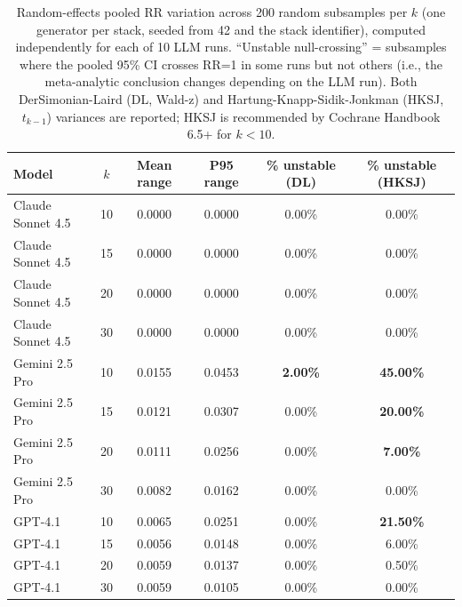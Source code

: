 \documentclass[11pt]{article}
\newenvironment{fittab}{\begin{lrbox}{\fittabbox}}{\end{lrbox}%
  \ifdim\wd\fittabbox>\linewidth\resizebox{\linewidth}{!}{\usebox{\fittabbox}}\else\usebox{\fittabbox}\fi}
\begin{document}
\begin{table}[htbp]
\centering
\caption{Random-effects pooled RR variation across 200 random subsamples per $k$ (one generator per stack, seeded from 42 and the stack identifier), computed independently for each of 10 LLM runs. ``Unstable null-crossing'' = subsamples where the pooled 95\% CI crosses RR=1 in some runs but not others (i.e., the meta-analytic conclusion changes depending on the LLM run). Both DerSimonian-Laird (DL, Wald-z) and Hartung-Knapp-Sidik-Jonkman (HKSJ, $t_{k{-}1}$) variances are reported; HKSJ is recommended by Cochrane Handbook 6.5+ for $k{<}10$.}
\label{tab:smalllit}
\begin{fittab}\begin{tabular}{lccccc}
\toprule
\textbf{Model} & \textbf{$k$} & \textbf{Mean range} & \textbf{P95 range} & \textbf{\% unstable (DL)} & \textbf{\% unstable (HKSJ)} \\
\midrule
Claude Sonnet 4.5 & 10 & 0.0000 & 0.0000 & 0.00\% & 0.00\% \\
Claude Sonnet 4.5 & 15 & 0.0000 & 0.0000 & 0.00\% & 0.00\% \\
Claude Sonnet 4.5 & 20 & 0.0000 & 0.0000 & 0.00\% & 0.00\% \\
Claude Sonnet 4.5 & 30 & 0.0000 & 0.0000 & 0.00\% & 0.00\% \\
Gemini 2.5 Pro    & 10 & 0.0155 & 0.0453 & \textbf{2.00\%} & \textbf{45.00\%} \\
Gemini 2.5 Pro    & 15 & 0.0121 & 0.0307 & 0.00\% & \textbf{20.00\%} \\
Gemini 2.5 Pro    & 20 & 0.0111 & 0.0256 & 0.00\% & \textbf{7.00\%} \\
Gemini 2.5 Pro    & 30 & 0.0082 & 0.0162 & 0.00\% & 0.00\% \\
GPT-4.1           & 10 & 0.0065 & 0.0251 & 0.00\% & \textbf{21.50\%} \\
GPT-4.1           & 15 & 0.0056 & 0.0148 & 0.00\% & 6.00\% \\
GPT-4.1           & 20 & 0.0059 & 0.0137 & 0.00\% & 0.50\% \\
GPT-4.1           & 30 & 0.0059 & 0.0105 & 0.00\% & 0.00\% \\
\bottomrule
\end{tabular}\end{fittab}
\end{table}
\end{document}

